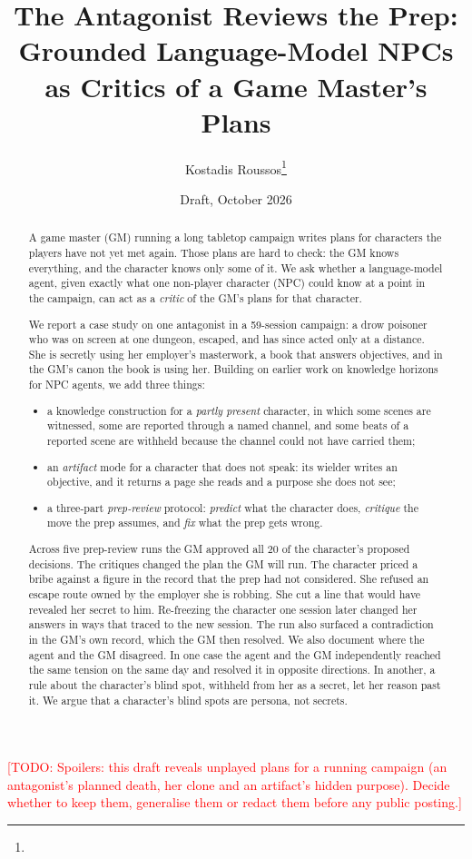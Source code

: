 \documentclass[11pt]{article}
\title{The Antagonist Reviews the Prep:\\
Grounded Language-Model NPCs as Critics of a Game Master's Plans}
\author{Kostadis Roussos\thanks{\todo{affiliation, contact}}}
\date{Draft, October 2026}
\newcommand{\todo}[1]{\textcolor{red}{[TODO: #1]}}
\begin{document}
\maketitle

\todo{Spoilers: this draft reveals unplayed plans for a running campaign (an antagonist's
planned death, her clone and an artifact's hidden purpose). Decide whether to keep them,
generalise them or redact them before any public posting.}

\begin{abstract}
A game master (GM) running a long tabletop campaign writes plans for characters the
players have not yet met again. Those plans are hard to check: the GM knows everything,
and the character knows only some of it. We ask whether a language-model agent, given
exactly what one non-player character (NPC) could know at a point in the campaign, can
act as a \emph{critic} of the GM's plans for that character.

We report a case study on one antagonist in a 59-session campaign: a drow poisoner who
was on screen at one dungeon, escaped, and has since acted only at a distance. She is
secretly using her employer's masterwork, a book that answers objectives, and in the GM's
canon the book is using her. Building on earlier work on knowledge horizons for NPC
agents, we add three things:
\begin{itemize}[nosep]
\item a knowledge construction for a \emph{partly present} character, in which some scenes
are witnessed, some are reported through a named channel, and some beats of a reported
scene are withheld because the channel could not have carried them;
\item an \emph{artifact} mode for a character that does not speak: its wielder writes an
objective, and it returns a page she reads and a purpose she does not see;
\item a three-part \emph{prep-review} protocol: \emph{predict} what the character does,
\emph{critique} the move the prep assumes, and \emph{fix} what the prep gets wrong.
\end{itemize}
Across five prep-review runs the GM approved all 20 of the character's proposed decisions.
The critiques changed the plan the GM will run. The character priced a bribe against a
figure in the record that the prep had not considered. She refused an escape route owned
by the employer she is robbing. She cut a line that would have revealed her secret to him.
Re-freezing the character one session later changed her answers in ways that traced to
the new session. The run also surfaced a contradiction in the GM's own record, which the
GM then resolved. We also document where the agent and the GM disagreed. In one case the
agent and the GM independently reached the same tension on the same day and resolved it
in opposite directions. In another, a rule about the character's blind spot, withheld from
her as a secret, let her reason past it. We argue that a character's blind spots are
persona, not secrets.
\end{abstract}
\end{document}
